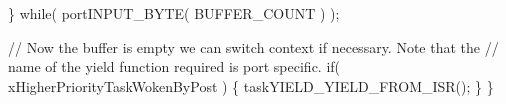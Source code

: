 \begin{DoxyPre}   \} while( portINPUT\_BYTE( BUFFER\_COUNT ) );\end{DoxyPre}



\begin{DoxyPre}   // Now the buffer is empty we can switch context if necessary.  Note that the
   // name of the yield function required is port specific.
   if( xHigherPriorityTaskWokenByPost )
   \{
    taskYIELD\_YIELD\_FROM\_ISR();
   \}
\}
\end{DoxyPre}
 